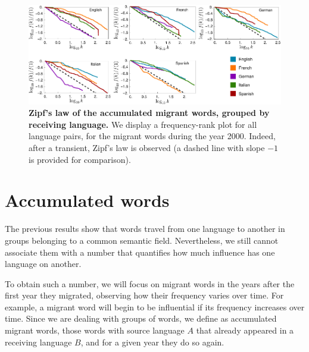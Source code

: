 \documentclass[10pt,letterpaper]{article} %
\begin{document}


\begin{figure}[!h]
	\begin{adjustwidth}{-2cm}{1cm}
		\centering
		\includegraphics{images/zipfFinal.pdf}
		\caption{{\bf Zipf's law of the accumulated migrant words,
grouped by receiving language.} We display a frequency-rank 
plot for all language pairs, for the migrant words during the year 2000.
Indeed, after a transient, Zipf's law is observed (a dashed line with slope $-1$ is
provided for comparison). }
		\label{fig.ZL_receiving}
	\end{adjustwidth}
\end{figure}

\section*{Accumulated words} %

The previous results show that words travel from one language to another in
groups belonging to a common semantic field. Nevertheless, we still cannot
associate them with a number that quantifies how much influence has one
language on another.

To obtain such a number, we will focus on migrant words in the years after the
first year they migrated, observing how their frequency varies over time. For
example, a migrant word will begin to be influential if its frequency increases
over time. Since we are dealing with groups of words, we define as accumulated
migrant words, those words with source language $A$ that already appeared in a
receiving language $B$, and for a given year they do so again.
\end{document}
